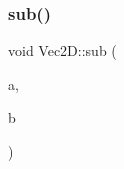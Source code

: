 \subsubsection{\texorpdfstring{sub()}{sub()}}
{\footnotesize\ttfamily void Vec2\+D\+::sub (\begin{DoxyParamCaption}\item[{\mbox{\hyperlink{struct_vec2_d_1_1_vec2_d}{Vec2D}} $\ast$}]{a,  }\item[{const \mbox{\hyperlink{struct_vec2_d_1_1_vec2_d}{Vec2D}} $\ast$}]{b }\end{DoxyParamCaption})\hspace{0.3cm}{\ttfamily [inline]}}

